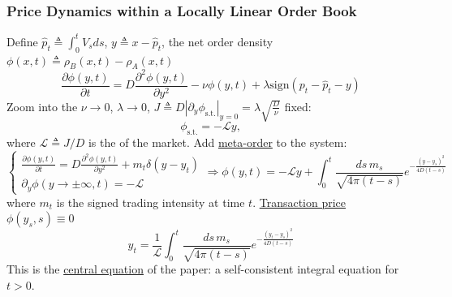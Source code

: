 \documentclass{beamer}
\begin{document}
\begin{frame}
\frametitle{Price Dynamics within a Locally Linear Order Book}
{
\footnotesize{
Define $\hat{p}_t \triangleq \int_0^t V_s ds$, $y\triangleq x-\hat{p}_t$, the net order density $\phi(x,t)\triangleq \rho_B(x,t)-\rho_A(x,t)$
$$
\frac{\partial \phi(y,t)}{\partial t} = D\frac{\partial^2 \phi(y,t)}{\partial y^2} -\nu \phi(y,t) + \lambda
\text{sign}(p_t - \hat{p}_t - y)
$$
Zoom into the \textit{\color{blue}{universal linear regime}}
$\nu\rightarrow 0$, $\lambda\rightarrow 0$, $J \triangleq D\left|\partial_y \phi_{\text{s.t.}} \right|_{y=0} = \lambda\sqrt{\frac{D}{\nu}}$ fixed:
$$
\phi_{\text{s.t.}} = -\mathcal{L} y,
$$
where $\mathcal{L}\triangleq J/D$ is the \textit{\color{blue}{latent liquidity}} of the market. Add \underline{meta-order}
to the system:
$$
\begin{cases}
\frac{\partial \phi(y,t)}{\partial t} = D\frac{\partial^2 \phi(y,t)}{\partial y^2}  + m_t \delta(y-y_t)\\
\partial_y \phi(y\rightarrow \pm\infty, t) = -\mathcal{L}
\end{cases}
\Rightarrow \phi(y,t) = -\mathcal{L}y + \int_0^t \frac{ds \, m_s}{\sqrt{4\pi(t-s)}} e^{-\frac{(y-y_s)^2}{4D(t-s)}}
$$
where $m_t$ is the signed trading intensity at time $t$. \underline{Transaction price} $\phi(y_s, s)\equiv 0$
$$
\boxed{
y_t = \frac{1}{\mathcal{L}}\int_0^t \frac{ds \, m_s}{\sqrt{4\pi(t-s)}} e^{-\frac{(y_t-y_s)^2}{4D(t-s)}}
}
$$ 
This is the \underline{central equation} of the paper: a self-consistent integral equation for $t>0$.
}
}
\end{frame}
\end{document}
